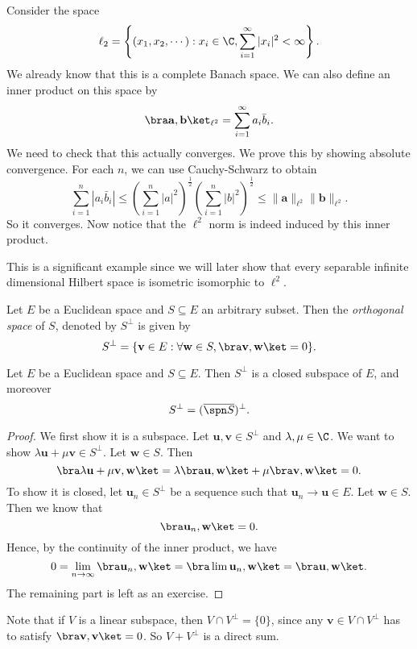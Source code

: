 \documentclass[a4paper]{article}
\begin{document}
\begin{eg}
  Consider the space
  \[
    \ell_2 = \left\{(x_1, x_2, \cdots): x_i \in \C, \sum_{i = 1}^\infty |x_i|^2 < \infty \right\}.
  \]
  We already know that this is a complete Banach space. We can also define an inner product on this space by
  \[
    \bra \mathbf{a}, \mathbf{b}\ket_{\ell^2} = \sum_{i = 1}^\infty a_i \bar{b}_i.
  \]
  We need to check that this actually converges. We prove this by showing absolute convergence. For each $n$, we can use Cauchy-Schwarz to obtain
  \[
    \sum_{i = 1}^n |a_i \bar{b}_i| \leq \left(\sum_{i = 1}^n|a|^2\right)^{\frac{1}{2}}\left(\sum_{i = 1}^n|b|^2\right)^{\frac{1}{2}} \leq \|\mathbf{a}\|_{\ell^2} \|\mathbf{b}\|_{\ell^2}.
  \]
  So it converges. Now notice that the $\ell^2$ norm is indeed induced by this inner product.
\end{eg}
This is a significant example since we will later show that every separable infinite dimensional Hilbert space is isometric isomorphic to $\ell^2$. %

\begin{defi}
  Let $E$ be a Euclidean space and $S\subseteq E$ an arbitrary subset. Then the \emph{orthogonal space} of $S$, denoted by $S^{\perp}$ is given by
  \[
    S^{\perp} = \{\mathbf{v} \in E: \forall \mathbf{w} \in S, \bra \mathbf{v}, \mathbf{w} \ket = 0\}.
  \]
\end{defi}

\begin{prop}
  Let $E$ be a Euclidean space and $S\subseteq E$. Then $S^\perp$ is a closed subspace of $E$, and moreover
  \[
    S^{\perp} = (\overline{\spn S})^{\perp}.
  \]
\end{prop}

\begin{proof}
  We first show it is a subspace. Let $\mathbf{u}, \mathbf{v} \in S^\perp$ and $\lambda, \mu \in \C$. We want to show $\lambda \mathbf{u} + \mu \mathbf{v} \in S^\perp$. Let $\mathbf{w} \in S$. Then
  \[
    \bra \lambda \mathbf{u} + \mu \mathbf{v}, \mathbf{w}\ket = \lambda \bra \mathbf{u}, \mathbf{w}\ket + \mu \bra \mathbf{v}, \mathbf{w}\ket = 0.
  \]
  To show it is closed, let $\mathbf{u}_n \in S^\perp$ be a sequence such that $\mathbf{u}_n \to \mathbf{u} \in E$. Let $\mathbf{w} \in S$. Then we know that
  \[
    \bra \mathbf{u}_n, \mathbf{w}\ket = 0.
  \]
  Hence, by the continuity of the inner product, we have
  \[
    0 = \lim_{n \to \infty} \bra \mathbf{u}_n, \mathbf{w}\ket = \bra \lim \mathbf{u}_n, \mathbf{w}\ket = \bra \mathbf{u}, \mathbf{w}\ket.
  \]
  The remaining part is left as an exercise. %
\end{proof}
Note that if $V$ is a linear subspace, then $V \cap V^\perp = \{0\}$, since any $\mathbf{v} \in V \cap V^\perp$ has to satisfy $\bra \mathbf{v}, \mathbf{v}\ket = 0$. So $V + V^\perp$ is a direct sum.
\end{document}
